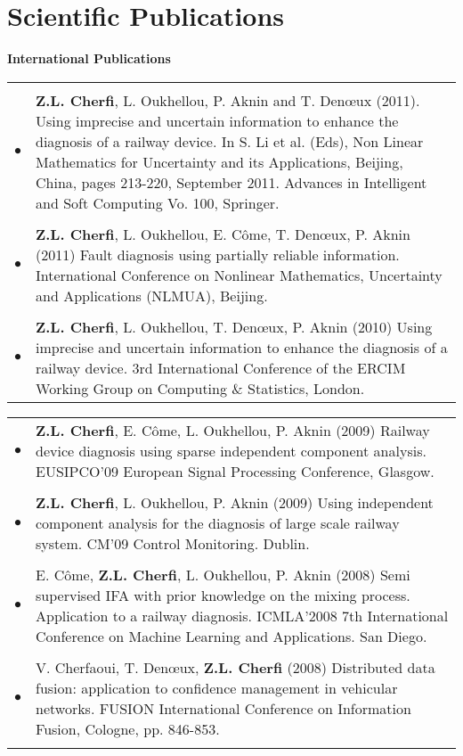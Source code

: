 \documentclass[a4paper,10pt]{article}
\begin{document}
\section{\textcolor{RedOrange}{Scientific Publications}}

\medskip
\textbf{International Publications}\\
\begin{tabular}{rp{14.2cm}}
& \\
$\bullet$ & \textbf{Z.L. Cherfi}, L. Oukhellou, P. Aknin and T. Den\oe ux (2011). Using imprecise and uncertain information to enhance the diagnosis of a railway device. In S. Li et al. (Eds), Non Linear Mathematics for Uncertainty and its Applications, Beijing, China, pages 213-220, September 2011. Advances in Intelligent and Soft Computing Vo. 100, Springer.\\
& \\
$\bullet$ & \textbf{Z.L. Cherfi}, L. Oukhellou, E. C\^ome, T. Den\oe ux, P. Aknin (2011) Fault diagnosis using partially reliable information. International Conference on Nonlinear Mathematics, Uncertainty and Applications (NLMUA), Beijing.\\
& \\
$\bullet$ & \textbf{Z.L. Cherfi}, L. Oukhellou, T. Den\oe ux, P. Aknin (2010) Using imprecise and uncertain information to enhance the diagnosis of a railway device. 3rd International Conference of the ERCIM Working Group on Computing $\&$ Statistics, London. \\
\end{tabular}

\begin{tabular}{rp{14.2cm}}
$\bullet$ & \textbf{Z.L. Cherfi}, E. C\^ome, L. Oukhellou, P. Aknin (2009) Railway device diagnosis using sparse independent component analysis. EUSIPCO'09 European Signal Processing Conference, Glasgow. \\
& \\
$\bullet$ & \textbf{Z.L. Cherfi}, L. Oukhellou, P. Aknin (2009) Using independent component analysis for the diagnosis of large scale railway system. CM'09 Control Monitoring. Dublin.\\
& \\
$\bullet$ & E. C\^ome, \textbf{Z.L. Cherfi}, L. Oukhellou, P. Aknin (2008) Semi supervised IFA with prior knowledge on the mixing process. Application to a railway diagnosis. ICMLA'2008 7th International Conference on Machine Learning and Applications. San Diego. \\
& \\
$\bullet$ & V. Cherfaoui, T. Den\oe ux, \textbf{Z.L. Cherfi} (2008) Distributed data fusion: application to confidence management in vehicular networks. FUSION International Conference on Information Fusion, Cologne, pp. 846-853.\\\multicolumn{2}{c}{} \\
\end{tabular}
\end{document}
